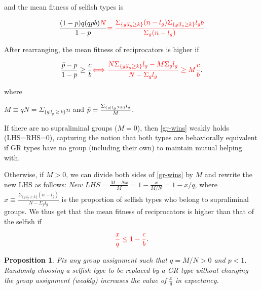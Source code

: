 \documentclass[12pt,a4paper]{article}
\newtheorem{prop}[theo]{Proposition}
\newcommand{\mm}[1]{{\color{red} #1}}
\begin{document}
and the mean fitness of selfish types is

\begin{equation*}
\frac{
  (1 - \bpi)q(q\bpi b)\mm{N}
}{
  1 - p
}
\mm{=\frac{\Sigma_{\{g|l_g \geq k\}}(n-l_g) \Sigma_{\{g|l_g \geq k\}}l_gb}{\Sigma_g(n-l_g)}}
\end{equation*}

After rearranging, the mean fitness of reciprocators is higher if


\begin{equation}
\label{gr-wins}
\frac{ \bpi - p}{ 1 - p} \ge \frac{c}{b}
\mm{\Longleftrightarrow \frac{N\Sigma_{\{g|l_g \geq k\}}l_g-M\Sigma_gl_g}{N-\Sigma_gl_g} \ge M\frac{c}{b}}.
\end{equation}

where \mm{$M \equiv qN=\Sigma_{\{g|l_g \geq k\}}n$ and $\bar{p} = \frac{\Sigma_{\{g|l_g \geq k\}}l_g}{M}$.


\vspace{0.2cm}
If there are no supraliminal groups ($M=0$), then \eqref{gr-wins} weakly holds (LHS=RHS=0), capturing the notion that both types are behaviorally equivalent if GR types have no group (including their own) to maintain mutual helping with.

Otherwise, if $M>0$, we can divide both sides of \eqref{gr-wins} by $M$ and rewrite the new LHS as follows: $New\_LHS=\frac{M-Nx}{M}=1-\frac{x}{M/N}=1-x/q$, where $x \equiv \frac{\Sigma_{\{g|l_g \geq k\}}(n-l_g)}{N-\Sigma_gl_g}$ is the proportion of selfish types who belong to supraliminal groups. We thus get that the mean fitness of reciprocators is higher than that of the selfish if
}

\begin{equation}
\label{gr-wins-2}
\mm{\frac{x}{q} \le 1-\frac{c}{b}}.
\end{equation}

\begin{prop}
\label{prop:decrease_in_p}
    \mm{Fix any group assignment such that $q=M/N >0$ and $p<1$. 
    Randomly choosing a selfish type to be replaced by a GR type without changing the group assignment (weakly) increases the value of $\frac{x}{q}$ in expectancy.}
\end{prop}
\end{document}
